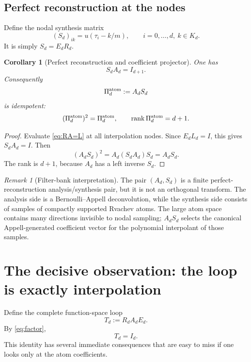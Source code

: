 \documentclass[11pt,oneside]{article}
\numberwithin{equation}{section}
\newtheorem{corollary}[theorem]{Corollary}
\theoremstyle{definition}
\theoremstyle{remark}
\newtheorem{remark}[theorem]{Remark}
\begin{document}
\subsection{Perfect reconstruction at the nodes}
Define the nodal synthesis matrix
\begin{equation}
 (S_d)_{ik}=u(\tau_i-k/m),\qquad i=0,\ldots,d,\ k\in K_d.
 \label{eq:S-matrix}
\end{equation}
It is simply \(S_d=E_dR_d\).

\begin{corollary}[Perfect reconstruction and coefficient projector]
\label{cor:perfect}
One has
\begin{equation}
 \boxed{S_dA_d=I_{d+1}.}
 \label{eq:SA=I}
\end{equation}
Consequently
\begin{equation}
 \Pi_d^{\rm atom}:=A_dS_d
 \label{eq:atom-projector-def}
\end{equation}
is idempotent:
\begin{equation}
 (\Pi_d^{\rm atom})^2=\Pi_d^{\rm atom},
 \qquad
 \operatorname{rank}\Pi_d^{\rm atom}=d+1.
 \label{eq:atom-projector}
\end{equation}
\end{corollary}

\begin{proof}
Evaluate \eqref{eq:RA=L} at all interpolation nodes.  Since
\(E_dL_d=I\), this gives \(S_dA_d=I\).  Then
\[
 (A_dS_d)^2=A_d(S_dA_d)S_d=A_dS_d.
\]
The rank is \(d+1\), because \(A_d\) has a left inverse \(S_d\).
\end{proof}

\begin{remark}[Filter-bank interpretation]
The pair \((A_d,S_d)\) is a finite perfect-reconstruction analysis/synthesis
pair, but it is not an orthogonal transform.  The analysis side is a Bernoulli--Appell
deconvolution, while the synthesis side consists of samples of compactly supported
Rvachev atoms.  The large atom space contains many directions invisible to nodal
sampling; \(A_dS_d\) selects the canonical Appell-generated coefficient vector for
the polynomial interpolant of those samples.
\end{remark}

\section{The decisive observation: the loop is exactly interpolation}
\label{sec:projector}
Define the complete function-space loop
\begin{equation}
 T_d:=R_dA_dE_d.
 \label{eq:Td}
\end{equation}
By \eqref{eq:factor},
\begin{equation}
 \boxed{T_d=I_d.}
 \label{eq:T=I}
\end{equation}
This identity has several immediate consequences that are easy to miss if one
looks only at the atom coefficients.
\end{document}
